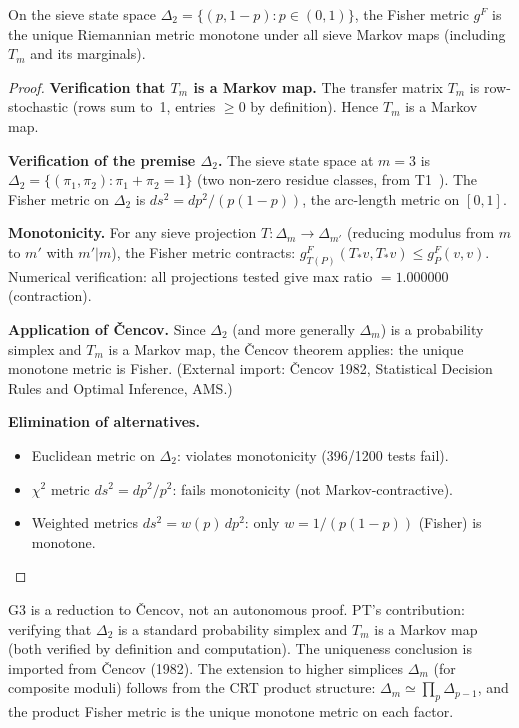 \documentclass[12pt,a4paper]{article}
\begin{document}
\mTHM
\begin{theorem}
\label{thm:G3}
On the sieve state space $\Delta_2 = \{(p, 1-p) : p \in (0,1)\}$,
the Fisher metric $g^F$ is the unique Riemannian metric monotone under
all sieve Markov maps (including $T_m$ and its marginals).

\begin{proof}
\textbf{Verification that $T_m$ is a Markov map.} The transfer matrix
$T_m$ is row-stochastic (rows sum to~1, entries $\geq 0$ by definition).
Hence $T_m$ is a Markov map.

\textbf{Verification of the premise $\Delta_2$.} The sieve state space
at $m = 3$ is $\Delta_2 = \{(\pi_1, \pi_2) : \pi_1 + \pi_2 = 1\}$
(two non-zero residue classes, from T1~\cite{companion_M1}). The Fisher metric on $\Delta_2$
is $ds^2 = dp^2/(p(1-p))$, the arc-length metric on $[0,1]$.

\textbf{Monotonicity.} For any sieve projection $T : \Delta_m \to \Delta_{m'}$
(reducing modulus from $m$ to $m'$ with $m' | m$), the Fisher metric
contracts: $g^F_{T(P)}(T_*v, T_*v) \leq g^F_P(v,v)$.
Numerical verification: all projections tested give max ratio $= 1.000000$
(contraction).

\textbf{Application of \v Cencov.} Since $\Delta_2$ (and more generally
$\Delta_m$) is a probability simplex and $T_m$ is a Markov map, the
\v Cencov theorem applies: the unique monotone metric is Fisher.
(External import: \v Cencov 1982, Statistical Decision Rules and
Optimal Inference, AMS.)

\textbf{Elimination of alternatives.}
\begin{itemize}
\item Euclidean metric on $\Delta_2$: violates monotonicity (396/1200
  tests fail).
\item $\chi^2$ metric $ds^2 = dp^2/p^2$: fails monotonicity (not Markov-contractive).
\item Weighted metrics $ds^2 = w(p)\,dp^2$: only $w = 1/(p(1-p))$ (Fisher)
  is monotone.
\end{itemize}
\end{proof}
\end{theorem}

\begin{remark}[Scope of G3]
G3 is a reduction to \v Cencov, not an autonomous proof. PT's contribution:
verifying that $\Delta_2$ is a standard probability simplex and $T_m$
is a Markov map (both verified by definition and computation).
The uniqueness conclusion is imported from \v Cencov (1982).
The extension to higher simplices $\Delta_m$ (for composite moduli)
follows from the CRT product structure: $\Delta_m \simeq \prod_p
\Delta_{p-1}$, and the product Fisher metric is the unique monotone
metric on each factor.
\end{remark}
\end{document}
